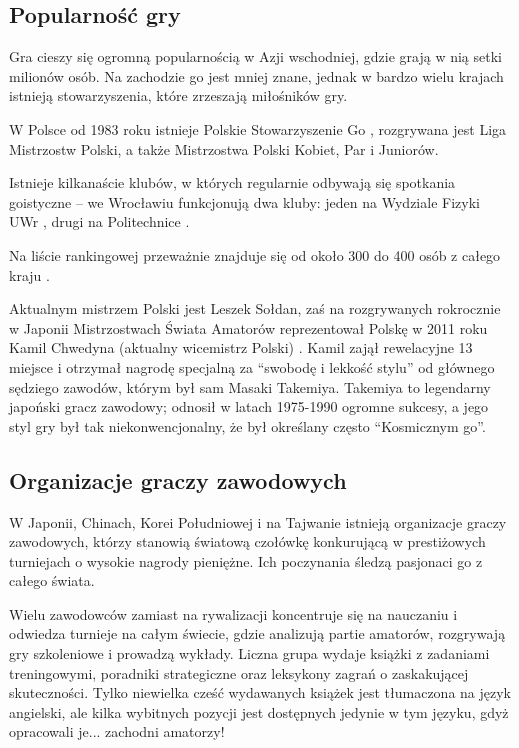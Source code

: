 \documentclass[11pt,leqno]{article}
\begin{document}
\subsection{Popularność gry }

Gra cieszy się ogromną popularnością w Azji wschodniej, gdzie grają w nią setki milionów osób. Na zachodzie go jest mniej znane, 
jednak w bardzo wielu krajach istnieją stowarzyszenia, które zrzeszają miłośników gry. 

W Polsce od 1983 roku istnieje Polskie Stowarzyszenie Go \cite{psg}, 
rozgrywana jest Liga Mistrzostw Polski, a także Mistrzostwa Polski Kobiet, Par i Juniorów. 

Istnieje kilkanaście klubów, w których regularnie odbywają się spotkania goistyczne 
-- we Wrocławiu funkcjonują dwa kluby: jeden na Wydziale Fizyki UWr \cite{gokurabu}, drugi na Politechnice \cite{sente}.

 Na liście rankingowej przeważnie znajduje się od około 300 do 400 osób z całego kraju \cite{ranking}.

Aktualnym mistrzem Polski jest Leszek Sołdan, zaś na rozgrywanych rokrocznie w Japonii Mistrzostwach Świata Amatorów 
reprezentował Polskę w 2011 roku Kamil Chwedyna (aktualny wicemistrz Polski) \cite{kamil1}. 
Kamil zajął rewelacyjne 13 miejsce \cite{kamil2} i otrzymał nagrodę specjalną za 
``swobodę i lekkość stylu'' od głównego sędziego zawodów, którym był sam Masaki Takemiya. 
Takemiya to legendarny japoński gracz zawodowy; odnosił w latach 1975-1990 ogromne sukcesy, a jego styl
gry był tak niekonwencjonalny, że był określany często ``Kosmicznym go''.

\subsection{Organizacje graczy zawodowych}
W Japonii, Chinach, Korei Południowej i na Tajwanie istnieją organizacje graczy zawodowych, którzy stanowią światową czołówkę konkurującą w 
prestiżowych turniejach o wysokie nagrody pieniężne. Ich poczynania śledzą pasjonaci go z całego świata. 

Wielu zawodowców zamiast na rywalizacji koncentruje się na nauczaniu i odwiedza turnieje na całym świecie, gdzie analizują 
partie amatorów, rozgrywają gry szkoleniowe i prowadzą wykłady. Liczna grupa wydaje książki z zadaniami treningowymi, 
poradniki strategiczne oraz leksykony zagrań o zaskakującej skuteczności. 
Tylko niewielka cześć wydawanych książek jest tłumaczona na język angielski, ale kilka wybitnych
 pozycji jest dostępnych jedynie w tym języku, gdyż opracowali je... zachodni amatorzy!
\end{document}
